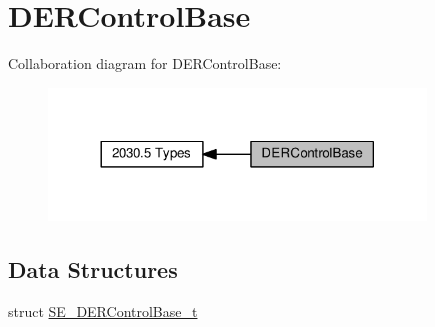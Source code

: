\hypertarget{group__DERControlBase}{}\section{D\+E\+R\+Control\+Base}
\label{group__DERControlBase}
Collaboration diagram for D\+E\+R\+Control\+Base\+:\nopagebreak
\begin{figure}[H]
\begin{center}
\leavevmode
\includegraphics[width=284pt]{group__DERControlBase}
\end{center}
\end{figure}
\subsection*{Data Structures}
\begin{DoxyCompactItemize}
\item 
struct \hyperlink{structSE__DERControlBase__t}{S\+E\+\_\+\+D\+E\+R\+Control\+Base\+\_\+t}
\end{DoxyCompactItemize}
